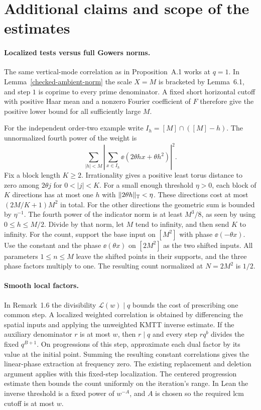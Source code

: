 \section{Additional claims and scope of the estimates}



\paragraph{Localized tests versus full Gowers norms.}
The same vertical-mode correlation as in Proposition~A.1 works at
$q=1$. In Lemma~\ref{checked-ambient-norm} the scale $X=M$ is
bracketed by Lemma~6.1, and step $1$ is coprime to every prime
denominator. A fixed short horizontal cutoff with positive Haar
mean and a nonzero Fourier coefficient of $F$ therefore give the
positive lower bound for all sufficiently large $M$.

For the independent order-two example write $I_h=[M]\cap([M]-h)$.
The unnormalized fourth power of the weight is
\[
 \sum_{|h|<M}
 \left|\sum_{x\in I_h}\ee(2\theta hx+\theta h^2)\right|^2 .
\]
Fix a block length $K\ge2$. Irrationality gives a positive least
torus distance to zero among $2\theta j$ for $0<|j|<K$.
For a small enough threshold $\eta>0$, each block of $K$
directions has at most one $h$ with $\lVert2\theta h\rVert_{\mathbb T}<\eta$.
These directions cost at most $(2M/K+1)M^2$ in total. For the
other directions the geometric sum is bounded by $\eta^{-1}$.
The fourth power of the indicator norm is at least $M^3/8$,
as seen by using $0\le h\le M/2$. Divide by that norm,
let $M$ tend to infinity, and then send $K$ to infinity.
For the count, support the base input on $[M^2]$ with
phase $\ee(-\theta x)$. Use the constant and the phase
$\ee(\theta x)$ on $[2M^2]$ as the two shifted inputs.
All parameters $1\le n\le M$ leave the shifted points in their
supports, and the three phase factors multiply to one.
The resulting count normalized at $N=2M^2$ is $1/2$.

\paragraph{Smooth local factors.}
In Remark~1.6 the divisibility $\mathcal L(w)\mid q$ bounds
the cost of prescribing one common step. A localized weighted
correlation is obtained by differencing the spatial inputs and
applying the unweighted KMTT inverse estimate. If the auxiliary
denominator $r$ is at most $w$, then $r\mid q$ and every step
$rq^b$ divides the fixed $q^{B+1}$. On progressions of this
step, approximate each dual factor by its value at the initial
point. Summing the resulting constant correlations gives the
linear-phase extraction at frequency zero. The existing
replacement and deletion argument applies with this fixed-step
localization. The centered progression estimate then bounds the
count uniformly on the iteration's range. In Lean the inverse
threshold is a fixed power of $w^{-A}$, and $A$ is chosen so the
required lcm cutoff is at most $w$.

